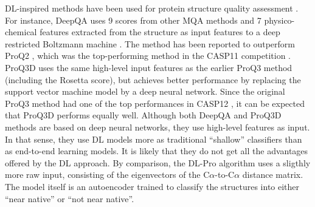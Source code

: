 
DL-inspired methods have been used for protein structure quality
assessment \cite{nguyen2014dlpro, cao2016deepqa,
uziela2017proq3d}. For instance, DeepQA \cite{cao2016deepqa} uses 9
scores from other MQA methods and 7 physico-chemical features
extracted from the structure as input features to a deep restricted
Boltzmann machine \cite{hinton2006fast}. The method has been
reported \cite{cao2016deepqa} to outperform ProQ2 \cite{ray2012proq2},
which was the top-performing method in the CASP11
competition \cite{kryshtafovych2015}.  ProQ3D \cite{uziela2017proq3d}
uses the same high-level input features as the earlier ProQ3
method \cite{uziela2016proq3} (including the
Rosetta \cite{leaverfay2011rosetta} score), but achieves better
performance by replacing the support vector machine model by a deep
neural network. Since the original ProQ3 method had one of the top
performances in CASP12 \cite{elofsson2017qacasp12}, it can be expected
that ProQ3D performs equally well. Although both DeepQA and ProQ3D
methods are based on deep neural networks, they use high-level
features as input. In that sense, they use DL models more as
traditional ``shallow'' classifiers than as end-to-end learning
models. It is likely that they do not get all the advantages offered
by the DL approach.
%
By comparison, the DL-Pro algorithm \cite{nguyen2014dlpro} uses a
sligthly more raw input, consisting of the eigenvectors of the
C$\alpha$-to-C$\alpha$ distance matrix. The model itself is an
autoencoder \cite{hinton2006reducing} trained to classify the
structures into either ``near native'' or ``not near native''.

